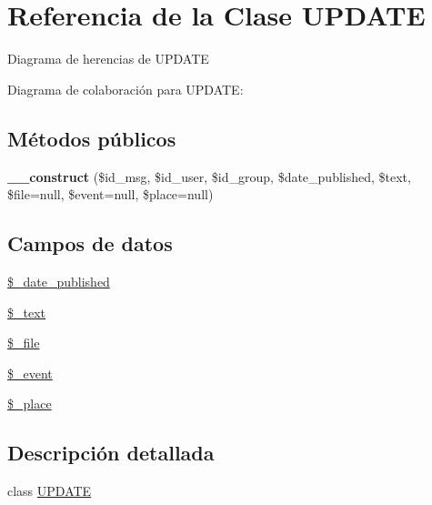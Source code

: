 \hypertarget{class_u_p_d_a_t_e}{\section{Referencia de la Clase U\-P\-D\-A\-T\-E}
\label{class_u_p_d_a_t_e}
}


Diagrama de herencias de U\-P\-D\-A\-T\-E


Diagrama de colaboración para U\-P\-D\-A\-T\-E\-:
\subsection*{Métodos públicos}
\begin{DoxyCompactItemize}
\item 
\hypertarget{class_u_p_d_a_t_e_a409a623df5e13fa3a0354a114a2b159d}{{\bfseries \-\_\-\-\_\-construct} (\$id\-\_\-msg, \$id\-\_\-user, \$id\-\_\-group, \$date\-\_\-published, \$text, \$file=null, \$event=null, \$place=null)}\label{class_u_p_d_a_t_e_a409a623df5e13fa3a0354a114a2b159d}

\end{DoxyCompactItemize}
\subsection*{Campos de datos}
\begin{DoxyCompactItemize}
\item 
\hyperlink{class_u_p_d_a_t_e_a18eb2ed8e237cc8ea4ab9beff2ac576a}{\$\-\_\-date\-\_\-published}
\item 
\hyperlink{class_u_p_d_a_t_e_a30dbc932171e87783bf0630dcdb5ad36}{\$\-\_\-text}
\item 
\hyperlink{class_u_p_d_a_t_e_abddaf0b77086e2b7d920f5d1a9616889}{\$\-\_\-file}
\item 
\hyperlink{class_u_p_d_a_t_e_ad6c677c9355a932f4eb84a01ddf072c4}{\$\-\_\-event}
\item 
\hyperlink{class_u_p_d_a_t_e_a7c2710f8add9b3b64b8f85f8d06d3687}{\$\-\_\-place}
\end{DoxyCompactItemize}


\subsection{Descripción detallada}
class \hyperlink{class_u_p_d_a_t_e}{U\-P\-D\-A\-T\-E} 

